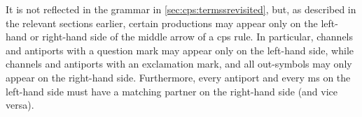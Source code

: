



It is not reflected in the grammar in \cref{sec:cps:termssrevisited}, but, as described in the relevant sections earlier, certain productions may appear only on the left-hand or right-hand side of the middle arrow of a \gls{cps} rule.  In particular, channels and antiports with a question mark may appear only on the left-hand side, while channels and antiports with an exclamation mark, and all out-symbols may only appear on the right-hand side.  Furthermore, every antiport and every \gls{ms} on the left-hand side must have a matching partner on the right-hand side (and vice versa).